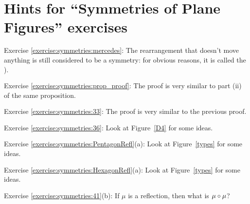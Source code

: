 \section{Hints for ``Symmetries of Plane Figures'' exercises}\label{sec:symmetries:hints}

\noindent Exercise \ref{exercise:symmetries:mercedes}: The rearrangement that doesn't move anything is still considered to be a symmetry: for obvious reasons, it is called the ).

\noindent Exercise \ref{exercise:symmetries:prop_proof}: The proof is very similar to part (ii) of the same proposition.

\noindent Exercise \ref{exercise:symmetries:33}: The proof is very similar to the previous proof.

\noindent Exercise \ref{exercise:symmetries:36}: Look at Figure~\ref{D4} for some ideas.

\noindent Exercise \ref{exercise:symmetries:PentagonRefl}(a): Look at Figure~\ref{types} for some ideas.

\noindent Exercise \ref{exercise:symmetries:HexagonRefl}(a): Look at Figure~\ref{types} for some ideas.

\noindent Exercise \ref{exercise:symmetries:41}(b): If $\mu$ is a reflection, then what is $\mu \circ \mu$?
